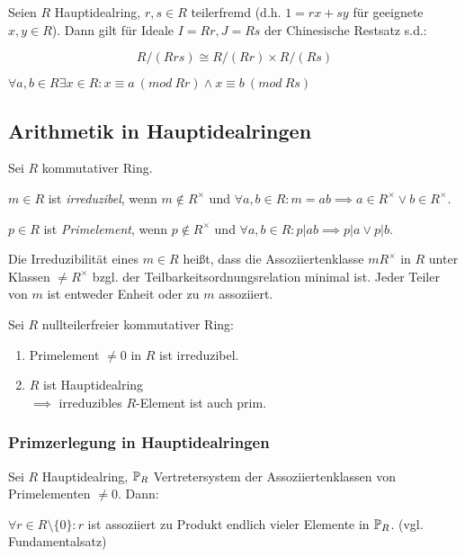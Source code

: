 Seien $R$ Hauptidealring, $r, s \in R$ teilerfremd (d.h. $1=rx+sy$ für geeignete $x, y \in R$). Dann gilt für Ideale $I = Rr, J = Rs$ der Chinesische Restsatz s.d.:

\vspace*{-2mm}
$$R/(Rrs) \cong R/(Rr) \times R/(Rs)$$

$\forall a, b \in R \exists x \in R : x \equiv a \ (mod \ Rr) \land x \equiv b \ (mod \ Rs)$

\subsection*{Arithmetik in Hauptidealringen}

Sei $R$ kommutativer Ring.

$m \in R$ ist \emph{irreduzibel}, wenn $m \notin R^\times$ und $\forall a, b \in R: m = ab \implies a \in R^\times \lor b \in R^\times$.

$p \in R$ ist \emph{Primelement}, wenn $p \notin R^\times$ und $\forall a, b \in R: p | ab \implies p | a \lor p | b$.

\spacing

Die Irreduzibilität eines $m \in R$ heißt, dass die Assoziiertenklasse $mR^\times$ in $R$ unter Klassen $\neq R^\times$ bzgl. der Teilbarkeitsordnungsrelation minimal ist. Jeder Teiler von $m$ ist entweder Enheit oder zu $m$ assoziiert.

\spacing

Sei $R$ nullteilerfreier kommutativer Ring:

\begin{enumerate}[label=(\alph*)]
	\item Primelement $\neq 0$ in $R$ ist irreduzibel.
	\item $R$ ist Hauptidealring \\ $\implies $ irreduzibles $R$-Element ist auch prim.
\end{enumerate}

\subsubsection*{Primzerlegung in Hauptidealringen}

Sei $R$ Hauptidealring, $\mathbb{P}_R$ Vertretersystem der Assoziiertenklassen von Primelementen $\neq 0$. Dann:

\vspace*{1mm}

$\forall r \in R \setminus \{0\} : r$ ist assoziiert zu Produkt endlich vieler Elemente in $\mathbb{P}_R$. (vgl. Fundamentalsatz)

